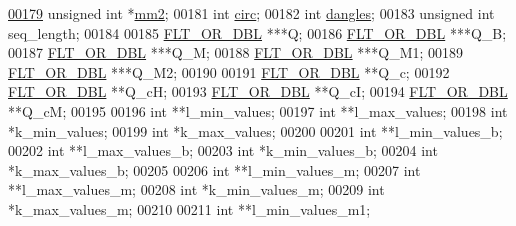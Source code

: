 \begin{DoxyCode}
\hyperlink{structTwoDpfold__vars_affb913470783f9edb12a0bfc22466269}{00179}   \textcolor{keywordtype}{unsigned} \textcolor{keywordtype}{int}          *\hyperlink{structTwoDpfold__vars_affb913470783f9edb12a0bfc22466269}{mm2};           
00181   \textcolor{keywordtype}{int}                   \hyperlink{group__model__details_gaf9202a1a09f5828dc731e2d9a10fa111}{circ};
00182   \textcolor{keywordtype}{int}                   \hyperlink{group__model__details_ga72b511ed1201f7e23ec437e468790d74}{dangles};
00183   \textcolor{keywordtype}{unsigned} \textcolor{keywordtype}{int}          seq\_length;
00184 
00185   \hyperlink{group__data__structures_ga31125aeace516926bf7f251f759b6126}{FLT\_OR\_DBL}            ***Q;
00186   \hyperlink{group__data__structures_ga31125aeace516926bf7f251f759b6126}{FLT\_OR\_DBL}            ***Q\_B;
00187   \hyperlink{group__data__structures_ga31125aeace516926bf7f251f759b6126}{FLT\_OR\_DBL}            ***Q\_M;
00188   \hyperlink{group__data__structures_ga31125aeace516926bf7f251f759b6126}{FLT\_OR\_DBL}            ***Q\_M1;
00189   \hyperlink{group__data__structures_ga31125aeace516926bf7f251f759b6126}{FLT\_OR\_DBL}            ***Q\_M2;
00190 
00191   \hyperlink{group__data__structures_ga31125aeace516926bf7f251f759b6126}{FLT\_OR\_DBL}            **Q\_c;
00192   \hyperlink{group__data__structures_ga31125aeace516926bf7f251f759b6126}{FLT\_OR\_DBL}            **Q\_cH;
00193   \hyperlink{group__data__structures_ga31125aeace516926bf7f251f759b6126}{FLT\_OR\_DBL}            **Q\_cI;
00194   \hyperlink{group__data__structures_ga31125aeace516926bf7f251f759b6126}{FLT\_OR\_DBL}            **Q\_cM;
00195 
00196   \textcolor{keywordtype}{int}                   **l\_min\_values;
00197   \textcolor{keywordtype}{int}                   **l\_max\_values;
00198   \textcolor{keywordtype}{int}                   *k\_min\_values;
00199   \textcolor{keywordtype}{int}                   *k\_max\_values;
00200 
00201   \textcolor{keywordtype}{int}                   **l\_min\_values\_b;
00202   \textcolor{keywordtype}{int}                   **l\_max\_values\_b;
00203   \textcolor{keywordtype}{int}                   *k\_min\_values\_b;
00204   \textcolor{keywordtype}{int}                   *k\_max\_values\_b;
00205 
00206   \textcolor{keywordtype}{int}                   **l\_min\_values\_m;
00207   \textcolor{keywordtype}{int}                   **l\_max\_values\_m;
00208   \textcolor{keywordtype}{int}                   *k\_min\_values\_m;
00209   \textcolor{keywordtype}{int}                   *k\_max\_values\_m;
00210 
00211   \textcolor{keywordtype}{int}                   **l\_min\_values\_m1;

\end{DoxyCode}
